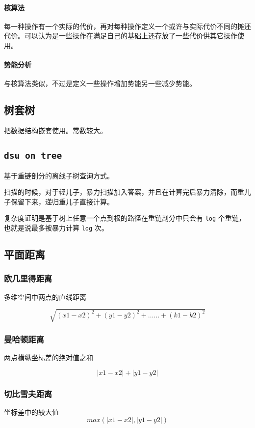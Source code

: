 \documentclass[UTF-8]{ctexart}
\begin{document}
	\paragraph{核算法} 每一种操作有一个实际的代价，再对每种操作定义一个或许与实际代价不同的摊还代价。可以认为是一些操作在满足自己的基础上还存放了一些代价供其它操作使用。
	
	\paragraph{势能分析} 与核算法类似，不过是定义一些操作增加势能另一些减少势能。
	
	\subsection{树套树}
	把数据结构嵌套使用。常数较大。
	
	\subsection{\texttt{dsu on tree}}
	基于重链剖分的离线子树查询方式。
	
	扫描的时候，对于轻儿子，暴力扫描加入答案，并且在计算完后暴力清除，而重儿子保留下来，递归重儿子直接计算。
	
	复杂度证明是基于树上任意一个点到根的路径在重链剖分中只会有 \texttt{log} 个重链，也就是说最多被暴力计算 \texttt{log} 次。
	
	\subsection{平面距离}
	\subsubsection{欧几里得距离}
	多维空间中两点的直线距离  
	
	$$\sqrt{(x1-x2)^2+(y1-y2)^2+……+(k1-k2)^2}$$
	
	\subsubsection{曼哈顿距离}
	两点横纵坐标差的绝对值之和
	
	$$|x1-x2|+|y1-y2|$$
	
	\subsubsection{切比雪夫距离}
	坐标差中的较大值
	$$max(|x1-x2|,|y1-y2|)$$
	
\end{document}
